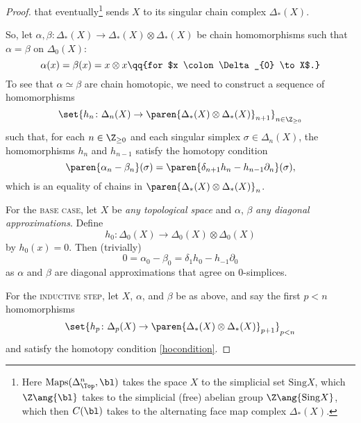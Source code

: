 \documentclass[onesided]{ccg-pset}
\begin{document}
\begin{enumerate}
\begin{proof}
   that eventually\footnote{Here $\mathrm{Maps}(\Delta^n_\Top, \bl)$ takes the space $X$ to the simplicial set $\mathrm{Sing}X$, which $\Z\ang{\bl}$ takes to the simplicial (free) abelian group $\Z \ang{\mathrm{Sing}X}$, which then $C(\bl)$ takes to the alternating face map complex $\Delta_*(X)$.} sends $X$ to its singular chain complex $\Delta_*(X)$.

   So, let $\alpha, \beta \colon \Delta_*(X) \to \Delta_*(X) \otimes \Delta_*(X)$ be chain homomorphisms such that $\alpha = \beta$ on $\Delta_0(X)$:
   \[
      \alpha(x) = \beta(x) =  x \otimes x \qq{for $x \colon \Delta_{0} \to X$.}
   \]
   To see that $\alpha \simeq \beta$ are chain homotopic, we need to construct a sequence of homomorphisms
   \[
      \set{h_n \colon \Delta_n(X) \to \paren{\Delta_*(X) \otimes \Delta_*(X)}_{n+1}}_{n \in \Z_{\ge 0}}
   \]
   \newcommand{\sing}[1]{\mathrm{Sing}}
   \newcommand{\sich}[2]{\Delta_{#1}(#2)}
   such that, for each $n \in \Z_{\ge 0}$ and each singular simplex $\sigma \in \sich n X$, the homomorphisms $h_{n}$ and $h_{n-1}$ satisfy the homotopy condition
   \begin{equation}
      \label{hocondition}
      \paren{\alpha_n - \beta_n}(\sigma) = \paren{\delta_{n+1} h_n - h_{n-1} \partial_n}(\sigma),
   \end{equation}
   which is an equality of chains in $\paren{\sich * X \otimes \sich * X}_n$.

   For the \textsc{base case}, let $X$ be \emph{any topological space} and $\alpha$, $\beta$ \emph{any diagonal approximations}. Define \[h_0 \colon \sich 0 X \to \sich 0 X \otimes \sich 0 X\] by $h_0 (x) = 0$. Then (trivially) \[0 = \alpha_0 - \beta_0 = \delta_1 h_0 - h_{-1} \partial_0\] as $\alpha$ and $\beta$ are diagonal approximations that agree on $0$-simplices.

   For the \textsc{inductive step}, let $X$, $\alpha$, and $\beta$ be as above, and say the first $p<n$ homomorphisms
   \[
      \set{h_p \colon \Delta_p(X) \to \paren{\Delta_*(X) \otimes \Delta_*(X)}_{p+1}}_{p < n}
   \]
   and satisfy the homotopy condition \eqref{hocondition}. 


\end{proof}
\end{enumerate}
\end{document}
